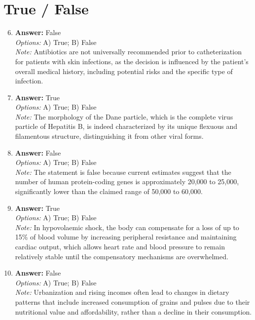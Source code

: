 \documentclass[12pt]{article}
\begin{document}
\section*{True / False}
\begin{enumerate}[label=\arabic*.]
\setcounter{enumi}{5}
\item \textbf{Answer:} False
\\ \textit{Options:} A) True; B) False
\\ \textit{Note:} Antibiotics are not universally recommended prior to catheterization for patients with skin infections, as the decision is influenced by the patient's overall medical history, including potential risks and the specific type of infection.
\item \textbf{Answer:} True
\\ \textit{Options:} A) True; B) False
\\ \textit{Note:} The morphology of the Dane particle, which is the complete virus particle of Hepatitis B, is indeed characterized by its unique flexuous and filamentous structure, distinguishing it from other viral forms.
\item \textbf{Answer:} False
\\ \textit{Options:} A) True; B) False
\\ \textit{Note:} The statement is false because current estimates suggest that the number of human protein-coding genes is approximately 20,000 to 25,000, significantly lower than the claimed range of 50,000 to 60,000.
\item \textbf{Answer:} True
\\ \textit{Options:} A) True; B) False
\\ \textit{Note:} In hypovolaemic shock, the body can compensate for a loss of up to 15\% of blood volume by increasing peripheral resistance and maintaining cardiac output, which allows heart rate and blood pressure to remain relatively stable until the compensatory mechanisms are overwhelmed.
\item \textbf{Answer:} False
\\ \textit{Options:} A) True; B) False
\\ \textit{Note:} Urbanization and rising incomes often lead to changes in dietary patterns that include increased consumption of grains and pulses due to their nutritional value and affordability, rather than a decline in their consumption.
\end{enumerate}
\end{document}

